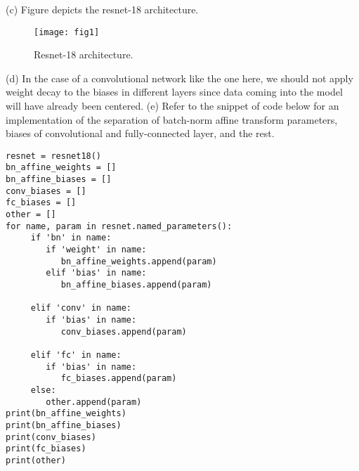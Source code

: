 \documentclass[12pt]{article}
\begin{document}
 \newline \newline 
(c) Figure depicts the resnet-18 architecture. \newline \newline 
\begin{figure}[H]
\centering
\texttt{[image: fig1]}
\caption{Resnet-18 architecture.}\label{visina8}
\end{figure}
(d) In the case of a convolutional network like the one here, we should not apply weight decay to the biases in different layers since data coming into the model will have already been centered. \newline \newline 
(e) Refer to the snippet of code below for an implementation of the separation of batch-norm affine transform parameters,  
biases of convolutional and fully-connected layer, and the rest. \newline \newline  
\begin{lstlisting}
resnet = resnet18() 
bn_affine_weights = [] 
bn_affine_biases = [] 
conv_biases = [] 
fc_biases = [] 
other = [] 
for name, param in resnet.named_parameters(): 
     if 'bn' in name:
        if 'weight' in name:  
           bn_affine_weights.append(param)   
        elif 'bias' in name: 
           bn_affine_biases.append(param)     
                        
     elif 'conv' in name:
        if 'bias' in name:  
           conv_biases.append(param)
           
     elif 'fc' in name:
        if 'bias' in name:  
           fc_biases.append(param)
     else: 
        other.append(param) 
print(bn_affine_weights) 
print(bn_affine_biases) 
print(conv_biases) 
print(fc_biases) 
print(other)  
\end{lstlisting} 
\end{document}

